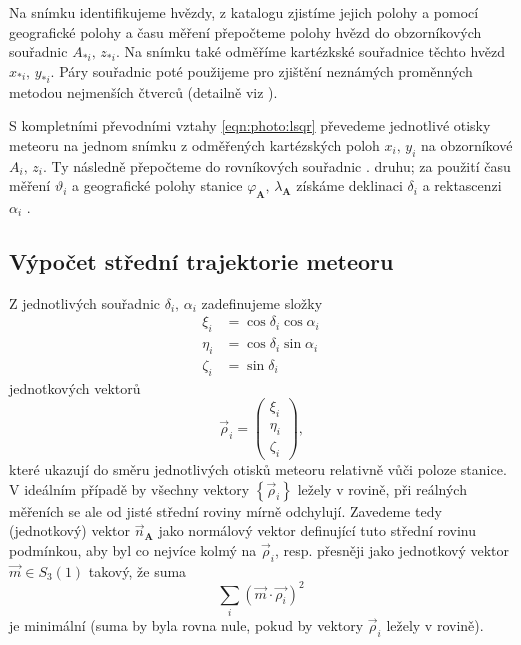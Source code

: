 Na snímku identifikujeme hvězdy, z katalogu zjistíme jejich polohy a pomocí geografické polohy a času měření přepočteme polohy hvězd do obzorníkových souřadnic $A_{\ast i},\,z_{\ast i}$. Na snímku také odměříme kartézkské souřadnice těchto hvězd $x_{\ast i},\,y_{\ast i}$. Páry souřadnic poté použijeme pro zjištění neznámých proměnných metodou nejmenších čtverců (detailně viz \cite[223--224]{ceplecha}).

S kompletními převodními vztahy \eqref{eqn:photo:lsqr} převedeme jednotlivé otisky meteoru na jednom snímku z odměřených kartézských poloh $x_i,\,y_i$ na obzorníkové $A_i,\,z_i$. Ty následně přepočteme do rovníkových souřadnic {\uppercase\expandafter{\relax}}. druhu; za použití času měření $\vartheta_i$ a geografické polohy stanice $\varphi_\mathbf{A},\,\lambda_\mathbf{A}$ získáme deklinaci $\delta_i$ a rektascenzi $\alpha_i$ \cite{ceplecha}.

\subsection{Výpočet střední trajektorie meteoru}%
Z jednotlivých souřadnic $\delta_i,\,\alpha_i$ zadefinujeme složky
\begin{equation}
    \begin{aligned}
        \xi_i   & =\cos{\delta_i}\cos{\alpha_i} \\
        \eta_i  & =\cos{\delta_i}\sin{\alpha_i} \\
        \zeta_i & =\sin{\delta_i}
    \end{aligned}
\end{equation}
jednotkových vektorů
$$
    \vec{\rho}_i=\begin{pmatrix}
        \xi_i \\\eta_i\\\zeta_i
    \end{pmatrix}\text{,}
$$
které ukazují do směru jednotlivých otisků meteoru relativně vůči poloze stanice. V ideálním případě by všechny vektory $\left\{\vec{\rho}_i\right\}$ ležely v rovině, při reálných měřeních se ale od jisté střední roviny mírně odchylují. Zavedeme tedy (jednotkový) vektor $\vec{n}_\mathbf{A}$ jako normálový vektor definující tuto střední rovinu podmínkou, aby byl co nejvíce kolmý na $\vec{\rho}_i$, resp. přesněji jako jednotkový vektor $\vec{m}\in S_3(1)$ takový, že suma
$$
    \sum_{i}{\left( \vec{m}\cdot\vec{\rho_i} \right)^2}
$$
je minimální \cite{ceplecha} (suma by byla rovna nule, pokud by vektory $\vec{\rho}_i$ ležely v rovině).

